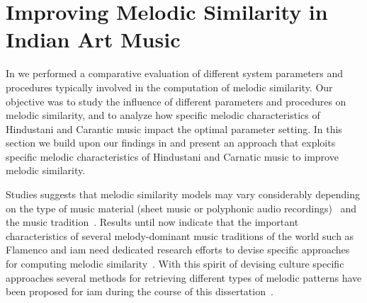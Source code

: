 \section{Improving Melodic Similarity in Indian Art Music}
\label{sec:patterns_improving_melodic_similarity}

In  we performed a comparative evaluation of different system parameters and procedures typically involved in the computation of melodic similarity. Our objective was to study the influence of different parameters and procedures on melodic similarity, and to analyze how specific melodic  characteristics of Hindustani and Carantic music impact the optimal parameter setting. In this section we build upon our findings in  and present an approach that exploits specific melodic characteristics of Hindustani and Carnatic music to improve melodic similarity. 

Studies suggests that melodic similarity models may vary considerably depending on the type of music material (sheet music or polyphonic audio recordings)~\citep{Marsden2012, collins2014bridging, ghias1995query} and the music tradition~\citep{Juhasz2009a, Conklin2010a}. Results until now indicate that the important characteristics of several melody-dominant music traditions of the world such as Flamenco and \gls{iam} need dedicated research efforts to devise specific approaches for computing melodic similarity~\citep{Pikrakis2012, Rao2014}. With this spirit of devising culture specific approaches several methods for retrieving different types of melodic patterns have been proposed for \gls{iam} during the course of this dissertation~\citep{Ross2012b,Ross2012,ishwar2012motivic,Rao2014,Ishwar2013,Dutta2014}. 

